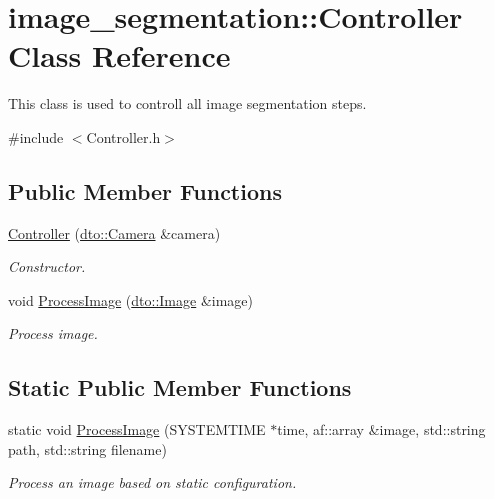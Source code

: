 \hypertarget{classimage__segmentation_1_1_controller}{}\section{image\+\_\+segmentation\+:\+:Controller Class Reference}
\label{classimage__segmentation_1_1_controller}


This class is used to controll all image segmentation steps.  




{\ttfamily \#include $<$Controller.\+h$>$}

\subsection*{Public Member Functions}
\begin{DoxyCompactItemize}
\item 
\mbox{\label{classimage__segmentation_1_1_controller_a5da68b4f711e142deccb0d36f7505227}} 
\mbox{\hyperlink{classimage__segmentation_1_1_controller_a5da68b4f711e142deccb0d36f7505227}{Controller}} (\mbox{\hyperlink{structdto_1_1_camera}{dto\+::\+Camera}} \&camera)
\begin{DoxyCompactList}\small\item\em Constructor. \end{DoxyCompactList}\item 
\mbox{\label{classimage__segmentation_1_1_controller_a297fd71f09bce22ab9e0f63608f96bad}} 
void \mbox{\hyperlink{classimage__segmentation_1_1_controller_a297fd71f09bce22ab9e0f63608f96bad}{Process\+Image}} (\mbox{\hyperlink{structdto_1_1_image}{dto\+::\+Image}} \&image)
\begin{DoxyCompactList}\small\item\em Process image. \end{DoxyCompactList}\end{DoxyCompactItemize}
\subsection*{Static Public Member Functions}
\begin{DoxyCompactItemize}
\item 
\mbox{\label{classimage__segmentation_1_1_controller_a7a9df45056fdbbbcbfd9b858b5cdeb88}} 
static void \mbox{\hyperlink{classimage__segmentation_1_1_controller_a7a9df45056fdbbbcbfd9b858b5cdeb88}{Process\+Image}} (S\+Y\+S\+T\+E\+M\+T\+I\+ME $\ast$time, af\+::array \&image, std\+::string path, std\+::string filename)
\begin{DoxyCompactList}\small\item\em Process an image based on static configuration. \end{DoxyCompactList}\end{DoxyCompactItemize}



